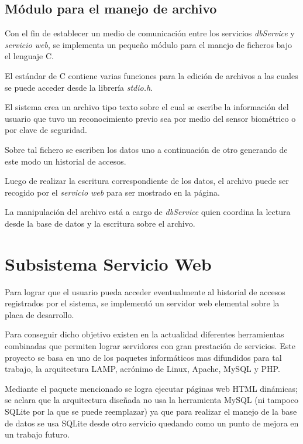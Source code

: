 \subsection{Módulo para el manejo de archivo}

Con el fin de establecer un medio de comunicación entre los servicios \textit{dbService} y  \textit{servicio web}, se implementa un pequeño módulo para el manejo de ficheros bajo el lenguaje C.

El estándar de C contiene varias funciones para la edición de archivos a las cuales se puede acceder desde la librería \textit{stdio.h}.

El sistema crea un archivo tipo texto sobre el cual se escribe la información del usuario que tuvo un reconocimiento previo sea por medio del sensor biométrico o por clave de seguridad.

Sobre tal fichero se escriben los datos uno a continuación de otro generando de este modo un historial de accesos.

Luego de realizar la escritura correspondiente de los datos, el archivo puede ser recogido por el \textit{servicio web} para ser mostrado en la página.

La manipulación del archivo está a cargo de \textit{dbService} quien coordina la lectura desde la base de datos y la escritura sobre el archivo.

\section{Subsistema Servicio Web}

Para lograr que el usuario pueda acceder eventualmente al historial de accesos registrados por el sistema, se implementó un servidor web elemental sobre la placa de desarrollo.

Para conseguir dicho objetivo existen en la actualidad diferentes herramientas combinadas que permiten lograr servidores con gran prestación de servicios. Este proyecto se basa en uno de los paquetes informáticos mas difundidos para tal trabajo, la arquitectura LAMP, acrónimo de Linux, Apache, MySQL y PHP.

Mediante el paquete mencionado se logra ejecutar páginas web HTML dinámicas; se aclara que la arquitectura diseñada no usa la herramienta MySQL (ni tampoco SQLite por la que se puede reemplazar) ya que para realizar el manejo de la base de datos se usa SQLite desde otro servicio quedando como un punto de mejora en un trabajo futuro. 

